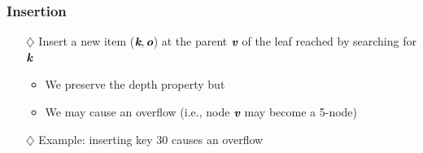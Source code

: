 \documentclass[pdf,
serif,
compress,
xcolor=table,
dvipsnames,
spanish,
aspectratio=169]{beamer}
\begin{document}
\begin{frame}
    \frametitle{Insertion}
    \begin{itemize}
    \color{purpura}
        \item[\(\diamondsuit\)] Insert a new item (\(\mathbf{\textit{\textbf{k}}}, \mathbf{\textit{\textbf{o}}}\)) at the parent \(\mathbf{\textit{\textbf{v}}}\) of the leaf reached by searching for \(\mathbf{\textit{\textbf{k}}}\)
        \begin{itemize}
            \color{purpura}
            \item We preserve the depth property but 
            \item We may cause an \textcolor{naranja}{overflow} (i.e., node \(\mathbf{\textit{\textbf{v}}}\) may become a 5-node)
        \end{itemize}
        \vspace{0.3cm}
        \item[\(\diamondsuit\)] Example: inserting key 30 causes an overflow
    \end{itemize}

    \vspace{0.15cm}
    
    \begin{tikzpicture}[
        level 1/.style={level distance=0.85cm},
        level 2/.style={sibling distance=1cm, level distance=0.85cm},
        edge from parent/.style={draw=none},
        ]
        

\end{tikzpicture}
\end{frame}
\end{document}
